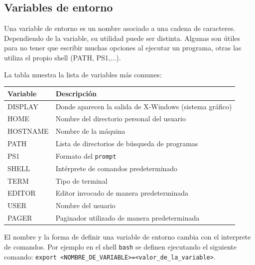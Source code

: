 \documentclass[12pt]{article}
\begin{document}

\subsection{Variables de entorno}

Una variable de entorno es un nombre asociado a una cadena de caracteres. Dependiendo de la variable, su utilidad puede ser distinta. 
Algunas son útiles para no tener que escribir muchas opciones al ejecutar un programa, otras las utiliza el propio shell (PATH, PS1,...). 

La tabla muestra la lista de variables más comunes:

\begin{center}
\begin{tabular}{|l|l|}\hline
\rowcolor{tcA}
Variable & Descripción \\\hline
DISPLAY & Donde aparecen la salida de X-Windows (sistema gráfico)\\\hline
HOME & Nombre del directorio personal del usuario\\\hline
HOSTNAME & Nombre de la máquina\\\hline
PATH & Lista de directorios de búsqueda de programas\\\hline
PS1 & Formato del \texttt{prompt}\\\hline
SHELL & Intérprete de comandos predeterminado\\\hline
TERM & Tipo de terminal\\\hline
EDITOR & Editor invocado de manera predeterminada\\\hline
USER & Nombre del usuario\\\hline
PAGER & Paginador utilizado de manera predeterminada\\\hline
\end{tabular}
\end{center}

El nombre y la forma de definir una variable de entorno cambia con el interprete de comandos.
Por ejemplo en el shell \texttt{bash} se definen ejecutando el siguiente comando: \texttt{export \textless NOMBRE\_DE\_VARIABLE\textgreater=\textless valor\_de\_la\_variable\textgreater}.
\end{document}
